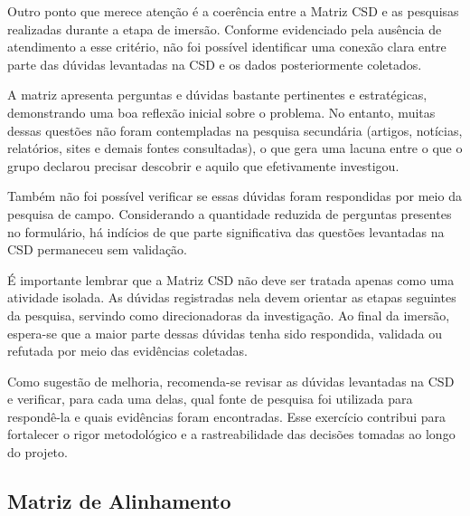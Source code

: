 \documentclass[
  sigconf,
  nonacm, %
  language=portuguese
]{acmart}
\newcommand{\statuswarn}[1]{{\small\bfseries\color{cwarn}#1}}
\begin{document}
Outro ponto que merece atenção é a coerência entre a Matriz CSD e as pesquisas realizadas durante a etapa de imersão. Conforme evidenciado pela ausência de atendimento a esse critério, não foi possível identificar uma conexão clara entre parte das dúvidas levantadas na CSD e os dados posteriormente coletados.

A matriz apresenta perguntas e dúvidas bastante pertinentes e estratégicas, demonstrando uma boa reflexão inicial sobre o problema. No entanto, muitas dessas questões não foram contempladas na pesquisa secundária (artigos, notícias, relatórios, sites e demais fontes consultadas), o que gera uma lacuna entre o que o grupo declarou precisar descobrir e aquilo que efetivamente investigou.

Também não foi possível verificar se essas dúvidas foram respondidas por meio da pesquisa de campo. Considerando a quantidade reduzida de perguntas presentes no formulário, há indícios de que parte significativa das questões levantadas na CSD permaneceu sem validação.

É importante lembrar que a Matriz CSD não deve ser tratada apenas como uma atividade isolada. As dúvidas registradas nela devem orientar as etapas seguintes da pesquisa, servindo como direcionadoras da investigação. Ao final da imersão, espera-se que a maior parte dessas dúvidas tenha sido respondida, validada ou refutada por meio das evidências coletadas.

Como sugestão de melhoria, recomenda-se revisar as dúvidas levantadas na CSD e verificar, para cada uma delas, qual fonte de pesquisa foi utilizada para respondê-la e quais evidências foram encontradas. Esse exercício contribui para fortalecer o rigor metodológico e a rastreabilidade das decisões tomadas ao longo do projeto.

\subsection{Matriz de Alinhamento}

\noindent\statuswarn{0,30\,/\,0,50 pts · Faltou pouco c/ erros}
\end{document}
